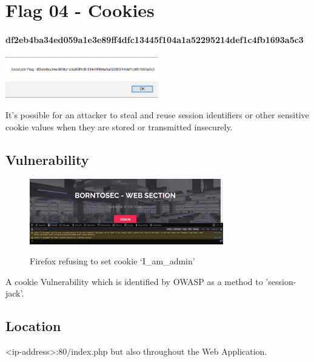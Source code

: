 \section{Flag 04 - Cookies}

\paragraph{df2eb4ba34ed059a1e3e89ff4dfc13445f104a1a52295214def1c4fb1693a5c3}
\begin{center}
    \includegraphics[width=0.5\textwidth]{07.Flag04/01-03.png}\\[0cm] 
\end{center}

It's possible for an attacker to steal and reuse
session identifiers or other sensitive cookie values
when they are stored or transmitted insecurely\cite{OWASPCookie}.

\subsection{Vulnerability}

\begin{figure}[!htb]
    \centering
    \includegraphics[width=0.752\textwidth]{07.Flag04/01-01.png}\\[0cm]  
    \caption[Cookie Alert]{Firefox refusing to set cookie `I\_am\_admin'}
    \label{fig:03-01 - Firefox rejects cookie iamadmin} 
\end{figure}
A cookie Vulnerability which is identified by OWASP as a
method to 'session-jack'\cite{OWASPCookie}.

\subsection{Location}

<ip-address>:80/index.php but also throughout the Web Application.

